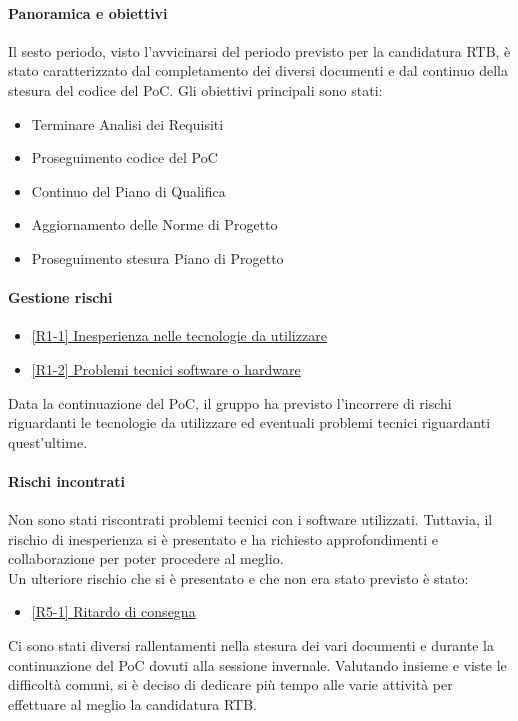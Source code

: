 \documentclass[a4paper,12pt]{article}
\begin{document}
            \paragraph{Panoramica e obiettivi}
            Il sesto periodo, visto l'avvicinarsi del periodo previsto per la candidatura RTB, è stato caratterizzato dal completamento dei diversi documenti e dal continuo della stesura del codice del PoC. Gli obiettivi principali sono stati:
            \begin{itemize}
                \item Terminare Analisi dei Requisiti
                \item Proseguimento codice del PoC
                \item Continuo del Piano di Qualifica
                \item Aggiornamento delle Norme di Progetto
                \item Proseguimento stesura Piano di Progetto
            \end{itemize}
            
            \paragraph{Gestione rischi}
                \begin{itemize}
                \item\hyperref[tab:r1]{[R1-1] Inesperienza nelle tecnologie da utilizzare}
                \item\hyperref[tab:r1]{[R1-2] Problemi tecnici software o hardware}
                \end{itemize}
                Data la continuazione del PoC, il gruppo ha previsto l'incorrere di rischi riguardanti le tecnologie da utilizzare ed eventuali problemi tecnici riguardanti quest'ultime.
    
                \paragraph*{Rischi incontrati}
                Non sono stati riscontrati problemi tecnici con i software utilizzati. Tuttavia, il rischio di inesperienza si è presentato e ha richiesto approfondimenti e collaborazione per poter procedere al meglio.
                \\Un ulteriore rischio che si è presentato e che non era stato previsto è stato:
                \begin{itemize}
                    \item \hyperref[tab:r5]{[R5-1] Ritardo di consegna}
                \end{itemize}
                Ci sono stati diversi rallentamenti nella stesura dei vari documenti e durante la continuazione del PoC dovuti alla sessione invernale. Valutando insieme e viste le difficoltà comuni, si è deciso di dedicare più tempo alle varie attività per effettuare al meglio la candidatura RTB.
                
\end{document}
